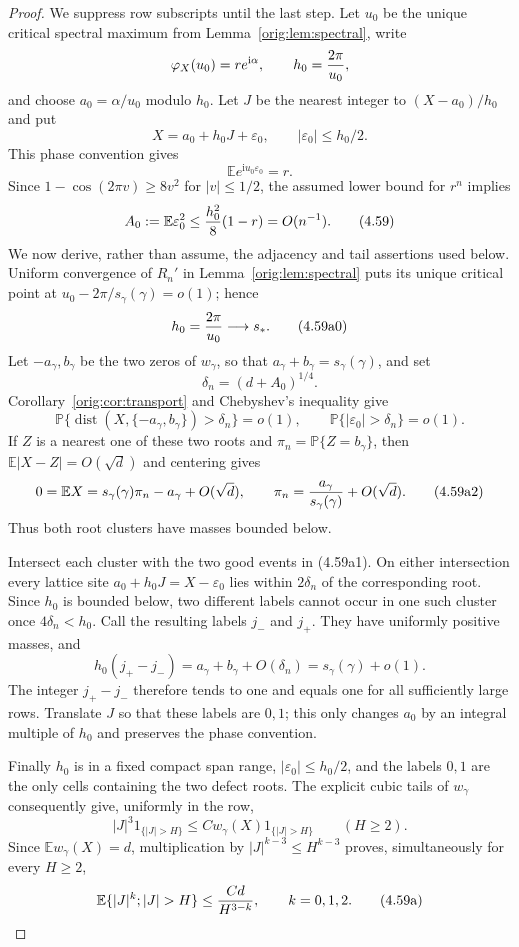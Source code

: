 \documentclass[11pt,a4paper]{article}
\numberwithin{equation}{section}
\theoremstyle{definition}
\theoremstyle{remark}
\newcommand{\E}{\mathbb E}
\newcommand{\Pp}{\mathbb P}
\newcommand{\ii}{\mathrm i}
\begin{document}
\begin{proof}
We suppress row subscripts until the last step.  Let $u_0$ be the unique
critical spectral maximum from Lemma~\ref{orig:lem:spectral}, write
\[
 \varphi_X(u_0)=r e^{\ii\alpha},\qquad h_0={2\pi\over u_0},
\]
and choose $a_0=\alpha/u_0$ modulo $h_0$.  Let $J$ be the nearest integer
to $(X-a_0)/h_0$ and put
\[
 X=a_0+h_0J+\varepsilon_0,\qquad |\varepsilon_0|\le h_0/2.
\]
This phase convention gives
\[
 \E e^{\ii u_0\varepsilon_0}=r.
\]
Since $1-\cos(2\pi v)\ge8v^2$ for $|v|\le1/2$, the assumed lower bound
for $r^n$ implies
\[
 A_0:=\E\varepsilon_0^2
 \le {h_0^2\over8}(1-r)=O(n^{-1}).                    \tag{4.59}
\]
We now derive, rather than assume, the adjacency and tail assertions used
below.  Uniform convergence of $R_n'$ in Lemma~\ref{orig:lem:spectral} puts its
unique critical point at
$u_0-2\pi/s_\gamma(\gamma)=o(1)$; hence
\[
                         h_0={2\pi\over u_0}\longrightarrow s_* .   \tag{4.59a0}
\]
Let $-a_\gamma,b_\gamma$ be the two zeros of $w_\gamma$, so that
$a_\gamma+b_\gamma=s_\gamma(\gamma)$, and set
\[
 \delta_n=(d+A_0)^{1/4}.
\]
Corollary~\ref{orig:cor:transport} and Chebyshev's inequality give
\[
 \Pp\{\operatorname {dist}(X,\{-a_\gamma,b_\gamma\})>\delta_n\}=o(1),
 \qquad \Pp\{|\varepsilon_0|>\delta_n\}=o(1).          \tag{4.59a1}
\]
If $Z$ is a nearest one of these two roots and
$\pi_n=\Pp\{Z=b_\gamma\}$, then
$\E|X-Z|=O(\sqrt d)$ and centering gives
\[
 0=\E X=s_\gamma(\gamma)\pi_n-a_\gamma+O(\sqrt d),
 \qquad \pi_n={a_\gamma\over s_\gamma(\gamma)}+O(\sqrt d). \tag{4.59a2}
\]
Thus both root clusters have masses bounded below.

Intersect each cluster with the two good events in (4.59a1).  On either
intersection every lattice site $a_0+h_0J=X-\varepsilon_0$ lies within
$2\delta_n$ of the corresponding root.  Since $h_0$ is bounded below,
two different labels cannot occur in one such cluster once
$4\delta_n<h_0$.  Call the resulting labels $j_-$ and $j_+$.  They have
uniformly positive masses, and
\[
 h_0(j_+-j_-)=a_\gamma+b_\gamma+O(\delta_n)
              =s_\gamma(\gamma)+o(1).                 \tag{4.59a3}
\]
The integer $j_+-j_-$ therefore tends to one and equals one for all
sufficiently large rows.  Translate $J$ so that these labels are $0,1$;
this only changes $a_0$ by an integral multiple of $h_0$ and preserves the
phase convention.

Finally $h_0$ is in a fixed compact span range, $|\varepsilon_0|\le h_0/2$,
and the labels $0,1$ are the only cells containing the two defect roots.
The explicit cubic tails of $w_\gamma$ consequently give, uniformly in
the row,
\[
 |J|^3 1_{\{|J|>H\}}\le Cw_\gamma(X)1_{\{|J|>H\}}
 \qquad(H\ge2).
\]
Since $\E w_\gamma(X)=d$, multiplication by
$|J|^{k-3}\le H^{k-3}$ proves, simultaneously for every $H\ge2$,
\[
 \E\{|J|^k;|J|>H\}\le {Cd\over H^{3-k}},
 \qquad k=0,1,2.                                      \tag{4.59a}
\]


\end{proof}
\end{document}

